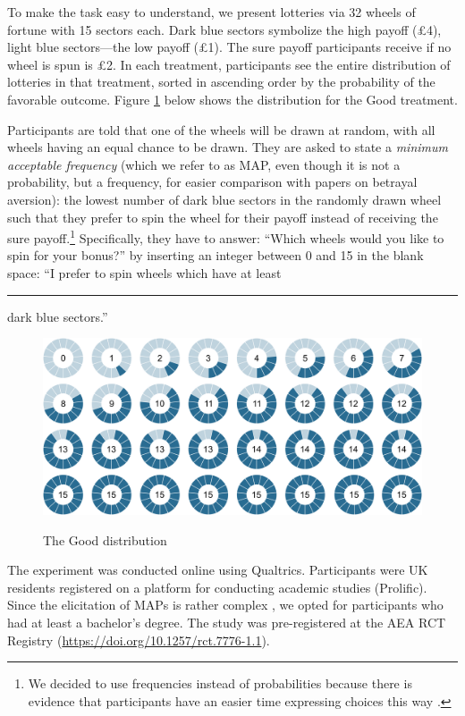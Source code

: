 To make the task easy to understand, we present lotteries via 32 wheels of fortune with 15 sectors each.
Dark blue sectors symbolize the high payoff (\pounds4), light blue sectors---the low payoff (\pounds1).
The sure payoff participants receive if no wheel is spun is \pounds2.
In each treatment, participants see the entire distribution of lotteries in that treatment, sorted in ascending order by the probability of the favorable outcome.
Figure \ref{fig:TheGood} below shows the distribution for the Good treatment.

Participants are told that one of the wheels will be drawn at random, with all wheels having an equal chance to be drawn.
They are asked to state a \textit{minimum acceptable frequency} (which we refer to as MAP, even though it is not a probability, but a frequency, for easier comparison with papers on betrayal aversion): the lowest number of dark blue sectors in the randomly drawn wheel such that they prefer to spin the wheel for their payoff instead of receiving the sure payoff.\footnote{
We decided to use frequencies instead of probabilities because there is evidence that participants have an easier time expressing choices this way \citep{Quercia2016}.}
Specifically, they have to answer: ``Which wheels would you like to spin for your bonus?'' by inserting an integer between 0 and 15 in the blank space: ``I prefer to spin wheels which have at least \rule{1cm}{0.15mm} dark blue sectors.''

\begin{figure}[h!]
  \centering
 {\includegraphics[width=\linewidth]{Left_15.pdf}}
  \caption{The Good distribution}
  \label{fig:TheGood}
\end{figure}

The experiment was conducted online using Qualtrics.
Participants were UK residents registered on a platform for conducting academic studies (Prolific).
Since the elicitation of MAPs is rather complex \citep{Quercia2016,Polipciuc2020}, we opted for participants who had at least a bachelor's degree.
The study was pre-registered at the AEA RCT Registry (\url{https://doi.org/10.1257/rct.7776-1.1}).


